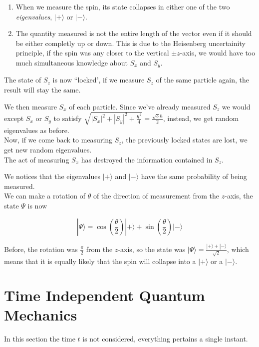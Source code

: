 \documentclass{article}
\begin{document}
\begin{enumerate}
    \item When we measure the spin, its state collapses in either one of the two \textit{eigenvalues}, \(|+\rangle\) or \(|-\rangle\).
    \item The quantity measured is not the entire length of the vector even if it should be either completly up or down.
        This is due to the Heisenberg uncertainity principle, if the spin was any closer to the vertical \(\pm z\)-axis,
        we would have too much simultaneous knowledge about \(S_x\) and \(S_y\).
\end{enumerate}

The state of \(S_z\) is now ``locked', if we measure \(S_z\) of the same particle again, the result will stay the same.

We then measure \(S_x\) of each particle. Since we've already measured \(S_z\) we would except \(S_x\) or \(S_y\)
to satisfy \(\sqrt{{|S_x|}^2 + {|S_y|}^2 + \frac{\hbar^2}{4}} = \frac{\sqrt{3}\hbar}{2}\), instead, we get random eigenvalues as before. \\
Now, if we come back to measuring \(S_z\), the previously locked states are lost, we get new random eigenvalues. \\
The act of measuring \(S_x\) has destroyed the information contained in \(S_z\).

We notices that the eigenvalues \(|+\rangle\) and \(|-\rangle\) have the same probability of being measured. \\
We can make a rotation of \(\theta\) of the direction of measurement from the \(z\)-axis, the state \(\Psi\) is now

\[
    |\Psi\rangle = \cos\left(\frac{\theta}{2}\right) |+\rangle + \sin\left(\frac{\theta}{2}\right)|-\rangle
\]

Before, the rotation was \(\frac{\pi}{2}\) from the \(z\)-axis, so the state was \(|\Psi\rangle=\frac{|+\rangle + |-\rangle}{\sqrt{2}}\),
which means that it is equally likely that the spin will collapse into a \(|+\rangle\) or a \(|-\rangle\).

\pagebreak

\section{Time Independent Quantum Mechanics}

In this section the time \(t\) is not considered, everything pertains a single instant.
\end{document}

